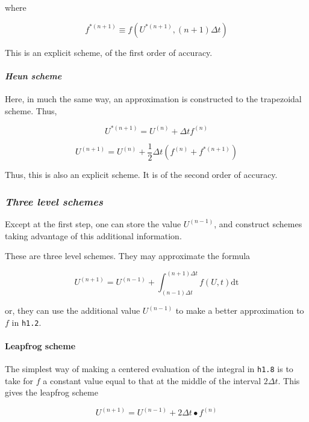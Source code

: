 where

\[{f^{*\left( n + 1 \right)}} \equiv f\left( U^{*\left( n + 1 \right)}, \left( n + 1 \right)\Delta t \right)\]

This is an explicit scheme, of the first order of accuracy.

\paragraph{\texorpdfstring{\emph{Heun
scheme}}{Heun scheme}}\label{heun-scheme}

Here, in much the same way, an approximation is constructed to the
trapezoidal scheme. Thus,

\[U^{*\left( n + 1 \right)} = U^{\left( n \right)} + \Delta t  f^{\left( n \right)}\]

\[U^{\left( n + 1 \right)} = U^{\left( n \right)} + \frac{1}{2}\Delta t\left( f^{\left( n \right)} + f^{*\left( n + 1 \right)} \right)\]

Thus, this is also an explicit scheme. It is of the second order of
accuracy.

\subsubsection{\texorpdfstring{\emph{Three level
schemes}}{Three level schemes}}\label{three-level-schemes}

Except at the first step, one can store the value
\(U^{\left( n - 1 \right)}\), and construct schemes taking advantage of
this additional information.

These are three level schemes. They may approximate the formula

\[U^{( n + 1 )} = U^{( n - 1 )} + \int_{( n - 1 )\Delta t}^{( n + 1 )\Delta t}f\left( U,t \right)\text{dt}\]

or, they can use the additional value \(U^{\left( n - 1 \right)}\) to
make a better approximation to \(f\) in \texttt{h1.2}.

\paragraph{Leapfrog scheme}\label{leapfrog-scheme}

The simplest way of making a centered evaluation of the integral in
\texttt{h1.8} is to take for \(f\) a constant value equal to that at the
middle of the interval \(2\Delta t\). This gives the leapfrog scheme

\[U^{\left( n + 1 \right)} = U^{\left( n - 1 \right)} + 2\Delta t \bullet f^{\left( n \right)}\]

